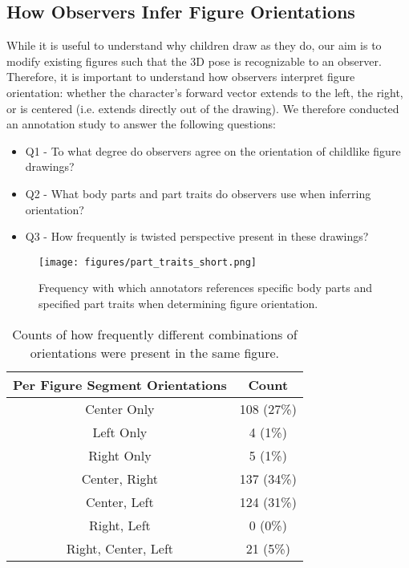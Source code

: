 \subsection{How Observers Infer Figure Orientations}
\label{sec:orientation}

While it is useful to understand why children draw as they do, our aim is to modify existing figures such that the 3D pose is recognizable to an observer. Therefore, it is important to understand how observers interpret figure orientation: whether the character's forward vector extends to the left, the right, or is centered (i.e. extends directly out of the drawing). We therefore conducted an annotation study to answer the following questions:
\begin{itemize}
  \item Q1 - To what degree do observers agree on the orientation of childlike figure drawings?
  \item Q2 - What body parts and part traits do observers use when inferring orientation?
  \item Q3 - How frequently is twisted perspective present in these drawings?
\end{itemize}





\begin{figure*}[ht]
\centering
\texttt{[image: figures/part\_traits\_short.png]}
\caption{Frequency with which annotators references specific body parts and specified part traits when determining figure orientation.}
\label{fig:part_count_orientation}
\end{figure*}

\begin{table}
  \centering
  \begin{tabular}{|c|c|}
    \hline
    Per Figure Segment Orientations & Count \\
    \hline
    Center Only & 108 (27\%)\\
    \hline
    Left Only & 4 (1\%)\\
    \hline
    Right Only & 5 (1\%)\\
    \hline
    Center, Right & 137 (34\%)\\
    \hline
    Center, Left & 124 (31\%)\\
    \hline
    Right, Left & 0 (0\%)\\
    \hline
    Right, Center, Left & 21 (5\%)\\
    \hline
  \end{tabular}
  \caption{Counts of how frequently different combinations of orientations were present in the same figure.}
  \label{table:twisted_perpspective_frequency}
\end{table}


